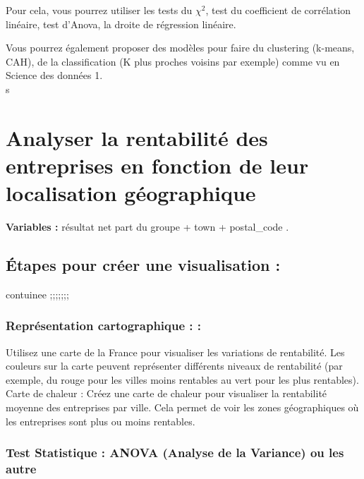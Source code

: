 \documentclass[mstat,12pt]{unswthesis}
\begin{document}
Pour cela, vous pourrez utiliser les tests du \(\chi^2\), test du
coefficient de corrélation linéaire, test d'Anova, la droite de
régression linéaire.

Vous pourrez également proposer des modèles pour faire du clustering
(k-means, CAH), de la classification (K plus proches voisins par
exemple) comme vu en Science des données 1.\\
s \newpage

\section{\texorpdfstring{\textbf{Analyser la rentabilité des entreprises
en fonction de leur localisation
géographique}}{Analyser la rentabilité des entreprises en fonction de leur localisation géographique}}\label{analyser-la-rentabilituxe9-des-entreprises-en-fonction-de-leur-localisation-guxe9ographique}

\bigskip

\textbf{Variables :} résultat net part du groupe + town + postal\_code .

\subsection{Étapes pour créer une visualisation
:}\label{uxe9tapes-pour-cruxe9er-une-visualisation-2}

contuinee ;;;;;;;

\subsubsection{Représentation cartographique :
:}\label{repruxe9sentation-cartographique}

\bigskip

Utilisez une carte de la France pour visualiser les variations de
rentabilité. \bigskip Les couleurs sur la carte peuvent représenter
différents niveaux de rentabilité (par exemple, du rouge pour les villes
moins rentables au vert pour les plus rentables). \bigskip Carte de
chaleur : Créez une carte de chaleur pour visualiser la rentabilité
moyenne des entreprises par ville. Cela permet de voir les zones
géographiques où les entreprises sont plus ou moins rentables.

\subsubsection{Test Statistique : ANOVA (Analyse de la Variance) ou les
autre}\label{test-statistique-anova-analyse-de-la-variance-ou-les-autre-2}
\end{document}

